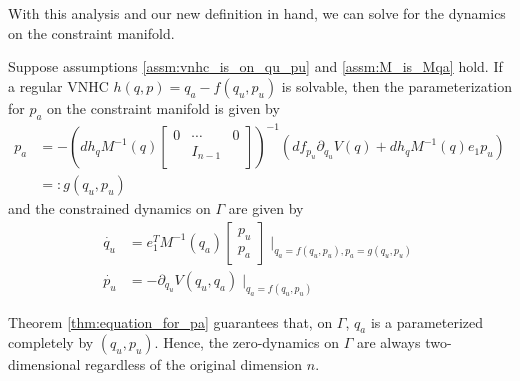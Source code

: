 With this analysis and our new definition in hand, we can solve for the dynamics on the constraint manifold.

\begin{thm}\label{thm:equation_for_pa}
Suppose assumptions \ref{assm:vnhc_is_on_qu_pu} and \ref{assm:M_is_Mqa} hold. If a regular VNHC \(h(q,p) = q_a - f(q_u,p_u)\) is solvable, then the parameterization for \(p_a\) on the constraint manifold is given by
\begin{align*}
p_a &= -\left(dh_q M^{-1}(q) \begin{bmatrix}
    0 & \cdots & 0 \\
    & I_{n-1} & \\
    \end{bmatrix}\right)^{-1}\left( df_{p_u}\partial_{q_u}V(q) + dh_q M^{-1}(q)e_1 p_u\right) \\
    &=: g(q_u,p_u)
\end{align*}
and the constrained dynamics on \(\Gamma\) are given by
\begin{align*}
    \dot{q_u} &= e_1^T M^{-1}(q_a) \begin{bmatrix}
    p_u \\
    p_a
    \end{bmatrix}\mid_{q_a = f(q_u,p_u), p_a = g(q_u,p_u)} \\
    \dot{p_u} &= -\partial_{q_u} V(q_u,q_a) \mid_{q_a = f(q_u,p_u)}
\end{align*}
\end{thm}

Theorem \ref{thm:equation_for_pa} guarantees that, on \(\Gamma\), \(q_a\) is a parameterized completely by \((q_u,p_u)\). Hence, the zero-dynamics on \(\Gamma\) are always two-dimensional regardless of the original dimension \(n\).
